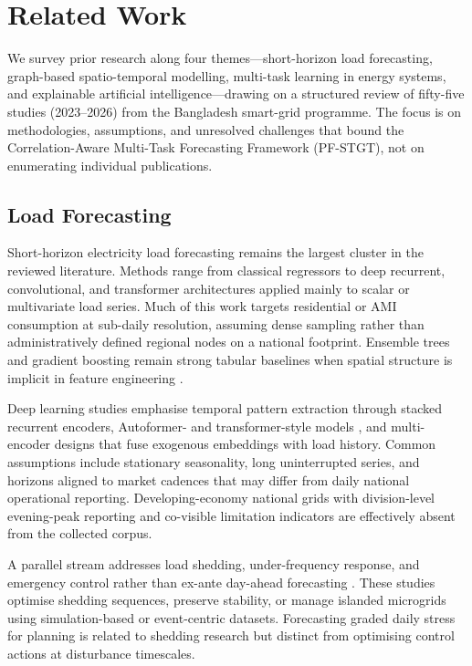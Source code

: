 \section{Related Work}\label{sec:related_work}

We survey prior research along four themes---short-horizon load forecasting, graph-based spatio-temporal modelling, multi-task learning in energy systems, and explainable artificial intelligence---drawing on a structured review of fifty-five studies (2023--2026) from the Bangladesh smart-grid programme. The focus is on methodologies, assumptions, and unresolved challenges that bound the Correlation-Aware Multi-Task Forecasting Framework (PF-STGT), not on enumerating individual publications.

\subsection{Load Forecasting}\label{subsection:load_forecasting}

Short-horizon electricity load forecasting remains the largest cluster in the reviewed literature. Methods range from classical regressors to deep recurrent, convolutional, and transformer architectures applied mainly to scalar or multivariate load series. Much of this work targets residential or AMI consumption at sub-daily resolution, assuming dense sampling rather than administratively defined regional nodes on a national footprint. Ensemble trees and gradient boosting remain strong tabular baselines when spatial structure is implicit in feature engineering \cite{Breiman2001RandomForest,Chen2016XGBoost,Musbah2025LoadForecasting}.

Deep learning studies emphasise temporal pattern extraction through stacked recurrent encoders, Autoformer- and transformer-style models \cite{Hochreiter1997LSTM,Wu2021Autoformer,Helmy2024AutoformerEV,Guillen2026LoadComposition}, and multi-encoder designs that fuse exogenous embeddings with load history. Common assumptions include stationary seasonality, long uninterrupted series, and horizons aligned to market cadences that may differ from daily national operational reporting. Developing-economy national grids with division-level evening-peak reporting and co-visible limitation indicators are effectively absent from the collected corpus.

A parallel stream addresses load shedding, under-frequency response, and emergency control rather than ex-ante day-ahead forecasting \cite{Paphitis2025SpatialLoadShedding,Wang2026SHAPLoadShedding}. These studies optimise shedding sequences, preserve stability, or manage islanded microgrids using simulation-based or event-centric datasets. Forecasting graded daily stress for planning is related to shedding research but distinct from optimising control actions at disturbance timescales.

